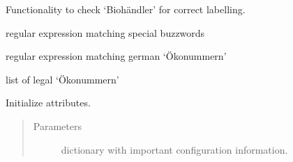 \documentclass[letterpaper,10pt,english]{sphinxmanual}
\begin{document}
\begin{fulllineitems}
\label{\detokenize{api:oeko.Oeko}}
Functionality to check ‘Biohändler’ for correct labelling.

\begin{fulllineitems}
\label{\detokenize{api:oeko.Oeko.buzz_reg}}
regular expression matching special buzzwords

\end{fulllineitems}


\begin{fulllineitems}
\label{\detokenize{api:oeko.Oeko.num_reg}}
regular expression matching german ‘Ökonummern’

\end{fulllineitems}


\begin{fulllineitems}
\label{\detokenize{api:oeko.Oeko.legal_numbers}}
list of legal ‘Ökonummern’

\end{fulllineitems}


\begin{fulllineitems}
\label{\detokenize{api:oeko.Oeko.__init__}}
Initialize attributes.
\begin{quote}\begin{description}
\item[{Parameters}] \leavevmode
{} \textendash{} dictionary with important configuration information.

\end{description}\end{quote}

\end{fulllineitems}



\end{fulllineitems}
\end{document}

